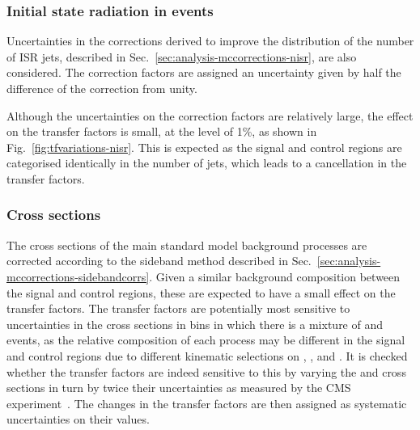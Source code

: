 
\subsubsection{Initial state radiation in \ttbar events}
Uncertainties in the corrections derived to improve the distribution of the 
number of ISR jets, described in Sec.~\ref{sec:analysis-mccorrections-nisr}, 
are also considered. The correction factors are assigned an uncertainty given 
by half the difference of the correction from unity.

Although the uncertainties on the correction factors are relatively large, the 
effect on the transfer factors is small, at the level of 1\%, as shown in 
Fig.~\ref{fig:tfvariations-nisr}. This is expected as the signal and control 
regions are categorised identically in the number of jets, which leads to a 
cancellation in the transfer factors.

\subsubsection{Cross sections}
The cross sections of the main standard model background processes are 
corrected according to the \mht sideband method described in 
Sec.~\ref{sec:analysis-mccorrections-sidebandcorrs}. Given a similar background 
composition between the signal and control regions, these are expected to have 
a small effect on the transfer factors. The \Tmutottw transfer factors are 
potentially most sensitive to uncertainties in the cross sections in bins in 
which there is a mixture of \wlj and \ttbar events, as the relative composition 
of each process may be different in the signal and control regions due to 
different kinematic selections on \alphat, \bdphi, and \mt. It is checked 
whether 
the transfer factors are indeed sensitive to this by varying the \wj and \ttbar 
cross sections in turn by twice their uncertainties as measured by the CMS 
experiment~\cite{xs-ttbar,xs-wjets}.
The changes in the transfer factors are then assigned as systematic 
uncertainties on their values.

